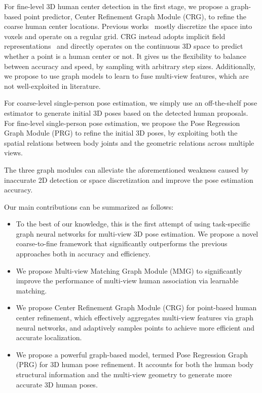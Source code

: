 \documentclass[10pt,twocolumn,letterpaper]{article}
\begin{document}
For fine-level 3D human center detection in the first stage, we propose a graph-based point predictor, \ie Center Refinement Graph Module (CRG), to refine the coarse human center locations. Previous works~\cite{amin2013multi,bridgeman2019multi,pavlakos2017coarse,pavlakos2018ordinal,tu2020voxelpose} mostly discretize the space into voxels and operate on a regular grid. CRG instead adopts implicit field representations~\cite{kirillov2020pointrend,saito2019pifu,saito2020pifuhd} and directly operates on the continuous 3D space to predict whether a point is a human center or not. It gives us the flexibility to balance between accuracy and speed, by sampling with arbitrary step sizes. Additionally, we propose to use graph models to learn to fuse multi-view features, which are not well-exploited in literature.

For coarse-level single-person pose estimation, we simply use an off-the-shelf pose estimator to generate initial 3D poses based on the detected human proposals. For fine-level single-person pose estimation, we propose the Pose Regression Graph Module (PRG) to refine the initial 3D poses, by exploiting both the spatial relations between body joints and the geometric relations across multiple views. 

The three graph modules can alleviate the aforementioned weakness caused by inaccurate 2D detection or space discretization and improve the pose estimation accuracy.

Our main contributions can be summarized as follows:
\begin{itemize}
\item To the best of our knowledge, this is the first attempt of using task-specific graph neural networks for multi-view 3D pose estimation. We propose a novel coarse-to-fine framework that significantly outperforms the previous approaches both in accuracy and efficiency.

\item We propose Multi-view Matching Graph Module (MMG) to significantly improve the performance of multi-view human association via learnable matching.

\item We propose Center Refinement Graph Module (CRG) for point-based human center refinement, which effectively aggregates multi-view features via graph neural networks, and adaptively samples points to achieve more efficient and accurate localization.


\item We propose a powerful graph-based model, termed Pose Regression Graph (PRG) for 3D human pose refinement. It accounts for both the human body structural information and the multi-view geometry to generate more accurate 3D human poses.

\end{itemize}
\end{document}
